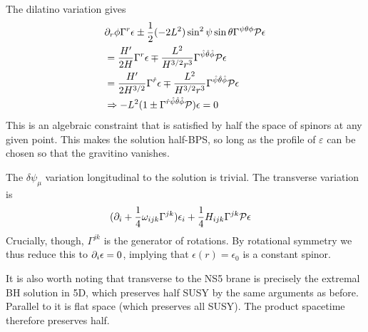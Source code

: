 \documentclass[11pt, class=article, crop=false]{standalone}
\begin{document}
\begin{enumerate}
	The dilatino variation gives
	\[
	\begin{aligned}
		& \partial_r \phi \Gamma^r \epsilon \pm \frac12 (-2 L^2) \sin^2 \psi \sin \theta \Gamma^{ \psi \theta \phi} \mathcal P \epsilon \\
		&= \frac{H'}{2 H} \Gamma^r \epsilon \mp \frac{L^2}{H^{3/2} r^3} \Gamma^{ \hat \psi \hat \theta \hat \phi} \mathcal P \epsilon\\
		&= \frac{H'}{2 H^{3/2}} \Gamma^{\hat r} \epsilon \mp \frac{L^2}{H^{3/2} r^3} \Gamma^{ \hat \psi \hat \theta \hat \phi} \mathcal P \epsilon\\
		&\Rightarrow - L^2 (1  \pm  \Gamma^{\hat r \hat \psi \hat \theta \hat \phi} \mathcal P)  \epsilon = 0
	\end{aligned}
	\]
	This is an algebraic constraint that is satisfied by half the space of spinors at any given point. This makes the solution half-BPS, so long as the profile of $\varepsilon$ can be chosen so that the gravitino vanishes.
	
	The $\delta \psi_\mu$ variation longitudinal to the solution is trivial. The transverse variation is
	\[
	\begin{aligned}
		& (\partial_i + \frac14 \omega_{i j k} \Gamma^{jk}) \epsilon_i + \frac14 H_{i j k} \Gamma^{j k} \mathcal P \epsilon
	\end{aligned}
	\]
	Crucially, though, $\Gamma^{jk}$ is the generator of rotations. By rotational symmetry we thus reduce this to $\partial_i \epsilon = 0$, implying that $\epsilon(r) = \epsilon_0$ is a constant spinor.
	
	It is also worth noting that transverse to the NS5 brane is precisely the extremal BH solution in 5D, which preserves half SUSY by the same arguments as before. Parallel to it is flat space (which preserves all SUSY). The product spacetime therefore preserves half.
	

\end{enumerate}
\end{document}
